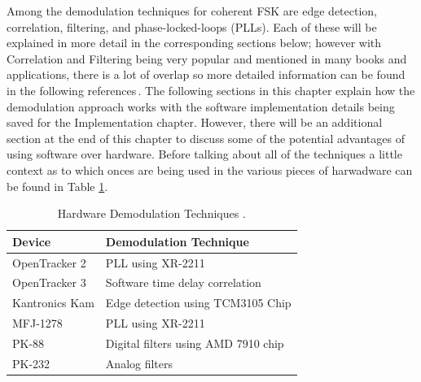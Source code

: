 Among the demodulation techniques for coherent FSK are edge detection, correlation, filtering, and phase-locked-loops (PLLs). Each of these will be explained in more detail in the corresponding sections below; however with Correlation and Filtering being very popular and mentioned in many books and applications, there is a lot of overlap so more detailed information can be found in the following references\,\cite{MarvinK.Simon1995,Sklar1988,J.Das1986,Proakis1983,Seguine2006,Semiconductor}. The following sections in this chapter explain how the demodulation approach works with the software implementation details being saved for the Implementation chapter. However, there will be an additional section at the end of this chapter to discuss some of the potential advantages of using software over hardware. Before talking about all of the techniques a little context as to which onces are being used in the various pieces of harwadware can be found in Table \ref{HardwareDemodTechniques}.

\begin{table}
	\begin{center}
		\begin{tabular}{ | l | l | }
			Device & Demodulation Technique \\ \hline
			OpenTracker 2 & PLL using XR-2211 \\ \hline
			OpenTracker 3 & Software time delay correlation \\ \hline
			Kantronics Kam & Edge detection using TCM3105 Chip \\ \hline
			MFJ-1278 & PLL using XR-2211 \\ \hline
			PK-88 & Digital filters using AMD 7910 chip \\ \hline
			PK-232 & Analog filters \\ \hline
		\end{tabular}
		\caption{Hardware Demodulation Techniques \cite{Inc.2001,EXAR1997,Devices1989,Instruments1994,MFJ1278Man,PK88Man}.}
		\label{HardwareDemodTechniques}
	\end{center}
\end{table}

